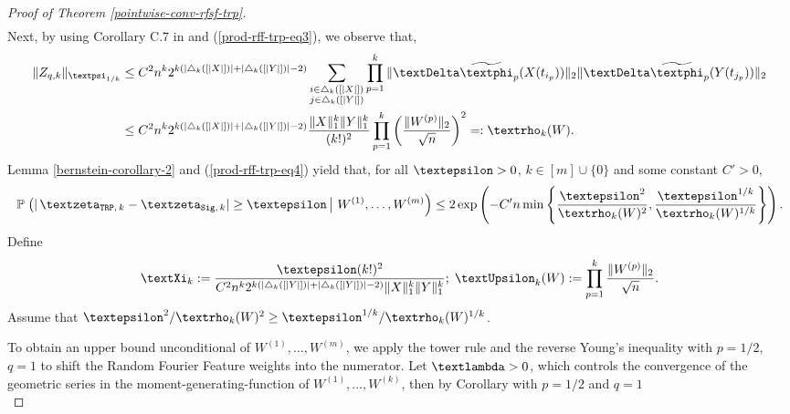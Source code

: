 \documentclass[openany]{book}
\begin{document}
\begin{proof}[Proof of Theorem \ref{pointwise-conv-rfsf-trp}]
\begin{equation}
\begin{split}
        \end{split}
        \end{equation}
        Next, by using Corollary C.7 in \cite{toth2025} and (\ref{prod-rff-trp-eq3}), we observe that,
        \begin{equation}\label{prod-rff-trp-eq4}
        \begin{split}
            \|Z_{q,k}\|_{\gpsi_{1/k}}&\leq C^2n^k2^{k(\vert\triangle_k([\vert X\vert ]) \vert +\vert \triangle_k([\vert Y\vert ])\vert -2)}\sum_{\substack{i\in \triangle_k([\vert X\vert ])\\ j\in \triangle_k([\vert Y\vert ])}}\prod_{p=1}^k\|\gDelta\widetilde{\gphi}_p(X(t_{i_p}))\|_2\|\gDelta\widetilde{\gphi}_p(Y(t_{j_p}))\|_{2} \\ &\leq C^2n^k2^{k(\vert\triangle_k([\vert X\vert ]) \vert +\vert \triangle_k([\vert Y\vert ])\vert -2)}\frac{\|X\|_1^k\|Y\|^k_{1}}{(k!)^2}\prod_{p=1}^k\left(\frac{\|W^{(p)}\|_{2}}{\sqrt{n}}\right)^2=:\grho_k(W).
        \end{split}
        \end{equation}
        Lemma \ref{bernstein-corollary-2} and (\ref{prod-rff-trp-eq4}) yield that, for all $\gepsilon>0$, $k\in [m]\cup\{0\}$ and some constant $C'>0$,
        \begin{equation*}
            \mathbb P\left.\left(\vert\,\gzeta_{\mathtt{TRP},\,k}-\gzeta_{\mathtt{Sig},\,k}\vert \geq \gepsilon\,\right\vert\,W^{(1)},\dots,W^{(m)} \right)\leq 2\exp\left(-C'n\min\left\{\frac{\gepsilon^2}{\grho_k(W)^2}, \frac{\gepsilon^{1/k}}{\grho_k(W)^{1/k}}\right\}\right).
        \end{equation*}
        Define
        \begin{equation*}
            \gXi_k:=\frac{\gepsilon(k!)^2}{C^2n^k2^{k(\vert\triangle_k([\vert Y\vert ]) \vert +\vert \triangle_k([\vert Y\vert ])\vert -2)}\|X\|_1^k\|Y\|^k_{1}};\; \gUpsilon_k(W):=\prod_{p=1}^k\frac{\|W^{(p)}\|_{2}}{\sqrt{n}}.
        \end{equation*} 
        Assume that $\gepsilon^2/\grho_k(W)^2\geq \gepsilon^{1/k}/\grho_k(W)^{1/k}$.\par To obtain an upper bound unconditional of $W^{(1)},\dots,W^{(m)}$, we apply the tower rule and the reverse Young's inequality with $p=1/2$, $q=1$ to shift the Random Fourier Feature weights into the numerator.
        Let $\glambda>0$, which controls the convergence of the geometric series in the moment-generating-function of $W^{(1)},\dots, W^{(k)}$, then by Corollary with $p=1/2$ and $q=1$
        \begin{equation}\label{pointwise-rfsf-trp-ineq-exp-ub}

\end{equation}
\end{proof}
\end{document}
